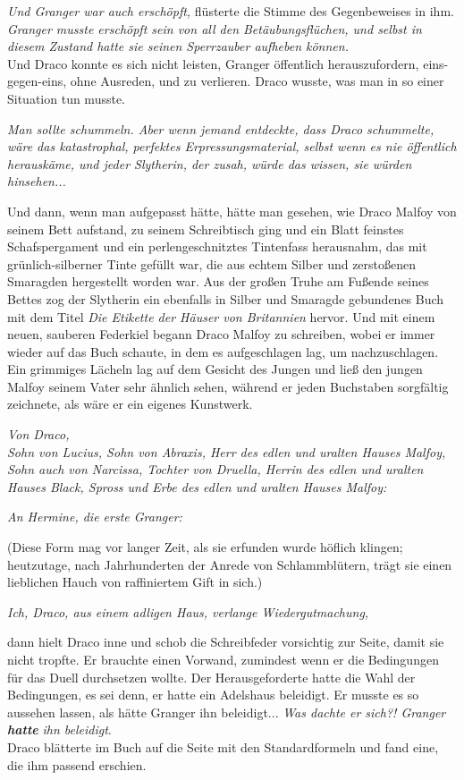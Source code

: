 {\emph{Und Granger war auch erschöpft,} flüsterte die Stimme des Gegenbeweises in ihm. \emph{Granger musste erschöpft sein von all den Betäubungsflüchen, und selbst in diesem Zustand hatte sie seinen Sperrzauber aufheben können.}\\ Und Draco konnte es sich nicht leisten, Granger öffentlich herauszufordern, eins-gegen-eins, ohne Ausreden, und zu verlieren. Draco wusste, was man in so einer Situation tun musste.

\emph{Man sollte schummeln. Aber wenn jemand entdeckte, dass Draco schummelte, wäre das katastrophal, perfektes Erpressungsmaterial, selbst wenn es nie öffentlich herauskäme, und jeder Slytherin, der zusah, würde das wissen, sie würden hinsehen...}

Und dann, wenn man aufgepasst hätte, hätte man gesehen, wie Draco Malfoy von seinem Bett aufstand, zu seinem Schreibtisch ging und ein Blatt feinstes Schafspergament und ein perlengeschnitztes Tintenfass herausnahm, das mit grünlich-silberner Tinte gefüllt war, die aus echtem Silber und zerstoßenen Smaragden hergestellt worden war. Aus der großen Truhe am Fußende seines Bettes zog der Slytherin ein ebenfalls in Silber und Smaragde gebundenes Buch mit dem Titel \emph{Die Etikette der Häuser von Britannien} hervor. Und mit einem neuen, sauberen Federkiel begann Draco Malfoy zu schreiben, wobei er immer wieder auf das Buch schaute, in dem es aufgeschlagen lag, um nachzuschlagen. Ein grimmiges Lächeln lag auf dem Gesicht des Jungen und ließ den jungen Malfoy seinem Vater sehr ähnlich sehen, während er jeden Buchstaben sorgfältig zeichnete, als wäre er ein eigenes Kunstwerk.

\emph{Von Draco,}\\ \emph{Sohn von Lucius, Sohn von Abraxis, Herr des edlen und uralten Hauses Malfoy,}\\ \emph{Sohn auch von Narcissa, Tochter von Druella, Herrin des edlen und uralten Hauses Black, Spross und Erbe des edlen und uralten Hauses Malfoy:}

\emph{An Hermine, die erste Granger:}

(Diese Form mag vor langer Zeit, als sie erfunden wurde höflich klingen; heutzutage, nach Jahrhunderten der Anrede von Schlammblütern, trägt sie einen lieblichen Hauch von raffiniertem Gift in sich.)

\emph{Ich, Draco, aus einem adligen Haus, verlange Wiedergutmachung,}

dann hielt Draco inne und schob die Schreibfeder vorsichtig zur Seite, damit sie nicht tropfte. Er brauchte einen Vorwand, zumindest wenn er die Bedingungen für das Duell durchsetzen wollte. Der Herausgeforderte hatte die Wahl der Bedingungen, es sei denn, er hatte ein Adelshaus beleidigt. Er musste es so aussehen lassen, als hätte Granger ihn beleidigt... \emph{Was dachte er sich?! Granger} \textbf{\emph{hatte}} \emph{ihn beleidigt}.\\ Draco blätterte im Buch auf die Seite mit den Standardformeln und fand eine, die ihm passend erschien.

}
